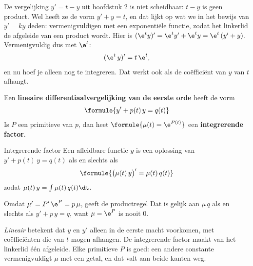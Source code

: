 De vergelijking $y' = t - y$ uit hoofdstuk 2 is niet scheidbaar: $t - y$ is geen product. Wel heeft ze de vorm $y' + y = t$, en dat lijkt op wat we in het bewijs van $y' = ky$ deden: vermenigvuldigen met een exponentiële functie, zodat het linkerlid de afgeleide van een product wordt. Hier is $(\e^t y)' = \e^t y' + \e^t y = \e^t\,(y' + y)$. Vermenigvuldig dus met $\e^t$:
\[
(\e^t\,y)' = t\,\e^t ,
\]
en nu hoef je alleen nog te integreren. Dat werkt ook als de coëfficiënt van $y$ van $t$ afhangt.

\begin{theorie}
Een \textbf{\textcolor{accent}{lineaire differentiaalvergelijking van de eerste orde}} heeft de vorm
\[
\formule{y' + p(t)\,y = q(t)}
\]
Is $P$ een primitieve van $p$, dan heet $\formule{\mu(t) = \e^{P(t)}}$ een \textbf{\textcolor{accent}{integrerende factor}}.

\begin{stelling}{Integrerende factor}
Een afleidbare functie $y$ is een oplossing van $y' + p(t)\,y = q(t)$ als en slechts als
\[
\formule{\bigl(\mu(t)\,y\bigr)' = \mu(t)\,q(t)}
\]
zodat $\mu(t)\,y = \int \mu(t)\,q(t)\dt$.
\end{stelling}

\begin{bewijs}
Omdat $\mu' = P'\,\e^{P} = p\,\mu$, geeft de productregel
Dat is gelijk aan $\mu\,q$ als en slechts als $y' + p\,y = q$, want $\mu = \e^{P}$ is nooit 0.
\end{bewijs}
\end{theorie}

\textit{Lineair} betekent dat $y$ en $y'$ alleen in de eerste macht voorkomen, met coëfficiënten die van $t$ mogen afhangen. De integrerende factor maakt van het linkerlid één afgeleide. Elke primitieve $P$ is goed: een andere constante vermenigvuldigt $\mu$ met een getal, en dat valt aan beide kanten weg.


